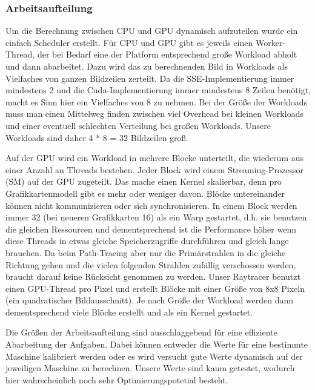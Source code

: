 \subsubsection{Arbeitsaufteilung}

Um die Berechnung zwischen CPU und GPU dynamisch aufzuteilen wurde ein einfach Scheduler erstellt. 
Für CPU und GPU gibt es jeweils einen Worker-Thread, der bei Bedarf eine der Platform entsprechend große Workload abholt und dann abarbeitet. 
Dazu wird das zu berechnenden Bild in Workloads als Vielfaches von ganzen Bildzeilen zerteilt. 
Da die SSE-Implementierung immer mindestens 2 und die Cuda-Implementierung immer mindestens 8 Zeilen benötigt, macht es Sinn hier ein Vielfaches von 8 zu nehmen. 
Bei der Größe der Workloads muss man einen Mittelweg finden zwischen viel Overhead bei kleinen Workloads und einer eventuell schlechten Verteilung bei großen Workloads. 
Unsere Workloads sind daher 4 * 8 = 32 Bildzeilen groß. 

Auf der GPU wird ein Workload in mehrere Blocke unterteilt, die wiederum aus einer Anzahl an Threads bestehen. 
Jeder Block wird einem Streaming-Prozessor (SM) auf der GPU zugeteilt. 
Das mache einen Kernel skalierbar, denn pro Grafikkartenmodell gibt es mehr oder weniger davon. Blöcke untereinander können nicht kommunizieren oder sich synchronisieren. 
In einem Block werden immer 32 (bei neueren Grafikkarten 16) als ein Warp gestartet, d.h. sie benutzen die gleichen Ressourcen und dementsprechend ist die Performance höher wenn diese Threads in etwas gleiche Speicherzugriffe durchführen und gleich lange brauchen. 
Da beim Path-Tracing aber nur die Primärstrahlen in die gleiche Richtung gehen und die vielen folgenden Strahlen zufällig verschossen werden, braucht darauf keine Rücksicht genommen zu werden. 
Unser Raytracer benutzt einen GPU-Thread pro Pixel und erstellt Blöcke mit einer Größe von 8x8 Pixeln (ein quadratischer Bildausschnitt). Je nach Größe der Workload werden dann dementsprechend viele Blöcke erstellt und als ein Kernel gestartet. 

Die Größen der Arbeitsaufteilung sind ausschlaggebend für eine effiziente Abarbeitung der Aufgaben. 
Dabei können entweder die Werte für eine bestimmte Maschine kalibriert werden oder es wird versucht gute Werte dynamisch auf der jeweiligen Maschine zu berechnen. 
Unsere Werte sind kaum getestet, wodurch hier wahrscheinlich noch sehr Optimierungspotetial besteht. 